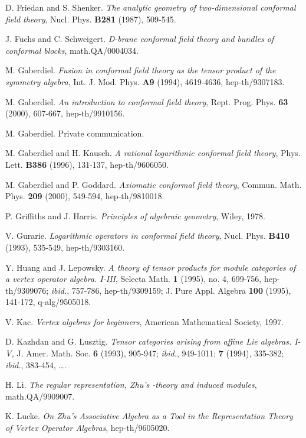 \documentclass[a4paper,12pt]{article}
\providecommand{\ti}[1]{\textit{#1}}
\begin{document}
\begin{thebibliography}{99}
 D. Friedan and S. Shenker.  \ti{The analytic geometry of two-dimensional conformal field theory}, Nucl. Phys. \textbf{B281} (1987), 509-545.

 J. Fuchs and C. Schweigert.  \ti{D-brane conformal field theory and bundles of conformal blocks}, math.QA/0004034.

 M. Gaberdiel.  \ti{Fusion in conformal field theory as the tensor product of the symmetry algebra}, Int. J. Mod. Phys. \textbf{A9} (1994), 4619-4636, hep-th/9307183.

 M. Gaberdiel.  \ti{An introduction to conformal field theory},
Rept. Prog. Phys. \textbf{63} (2000), 607-667, hep-th/9910156.

 M. Gaberdiel.  Private communication.

 M. Gaberdiel and H. Kausch.  \ti{A rational logarithmic conformal field theory}, Phys. Lett. \textbf{B386} (1996), 131-137, hep-th/9606050.

 M. Gaberdiel and P. Goddard.  \ti{Axiomatic conformal field theory}, Commun. Math. Phys. \textbf{209} (2000), 549-594, hep-th/9810018.

 P. Griffiths and J. Harris.  \ti{Principles of algebraic geometry}, Wiley, 1978.

 V. Gurarie.  \ti{Logarithmic operators in conformal field theory}, Nucl. Phys. \textbf{B410} (1993), 535-549, hep-th/9303160.

 Y. Huang and J. Lepowsky.  \ti{A theory of tensor products for module categories of a vertex operator algebra.  I-III},  Selecta Math. \textbf{1} (1995), no. 4, 699-756, hep-th/9309076; \ti{ibid.}, 757-786, hep-th/9309159; J. Pure Appl. Algebra \textbf{100} (1995), 141-172, q-alg/9505018.

 V. Kac.  \ti{Vertex algebras for beginners}, American Mathematical Society, 1997.

 D. Kazhdan and G. Lusztig.  \ti{Tensor categories arising from affine Lie algebras. I-V,} J. Amer. Math.
Soc. \textbf{6} (1993), 905-947; \ti{ibid.}, 949-1011; \textbf{7} (1994), 335-382; \ti{ibid.}, 383-454, \dots.

 H. Li.  \ti{The regular representation, Zhu's \coordHE{}-theory and induced modules}, math.QA/9909007.

 K. Lucke.  \ti{On Zhu's Associative Algebra as a Tool in the Representation Theory of Vertex Operator Algebras}, hep-th/9605020.


\end{thebibliography}
\end{document}
